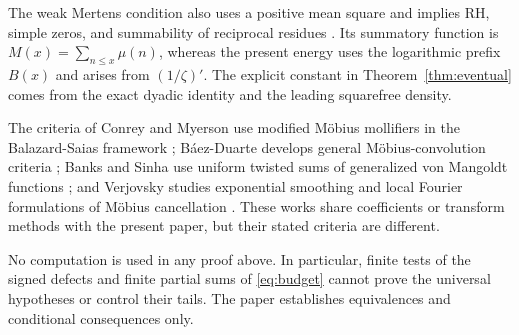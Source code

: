 \documentclass[11pt,a4paper]{amsart}
\theoremstyle{definition}
\theoremstyle{remark}
\begin{document}
The weak Mertens condition also uses a positive mean square and implies RH,
simple zeros, and summability of reciprocal residues
\cite{Titchmarsh1986,Ng2004}.  Its summatory function is
$M(x)=\sum_{n\leq x}\mu(n)$, whereas the present energy uses the logarithmic
prefix $B(x)$ and arises from $(1/\zeta)'$.  The explicit constant in
Theorem~\ref{thm:eventual} comes from the exact dyadic identity and the
leading squarefree density.

The criteria of Conrey and Myerson use modified M\"obius mollifiers in the
Balazard-Saias framework \cite{ConreyMyerson2000}; B\'aez-Duarte develops
general M\"obius-convolution criteria \cite{BaezDuarte2005}; Banks and Sinha
use uniform twisted sums of generalized von Mangoldt functions
\cite{BanksSinha2022}; and Verjovsky studies exponential smoothing and local
Fourier formulations of M\"obius cancellation \cite{Verjovsky2026}.  These
works share coefficients or transform methods with the present paper, but
their stated criteria are different.

No computation is used in any proof above.  In particular, finite tests of
the signed defects and finite partial sums of \eqref{eq:budget} cannot prove
the universal hypotheses or control their tails.  The paper establishes
equivalences and conditional consequences only.
\end{document}
